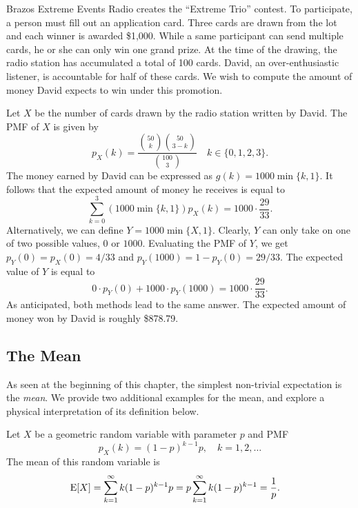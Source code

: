 \begin{example}
Brazos Extreme Events Radio creates the ``Extreme Trio'' contest.
To participate, a person must fill out an application card.
Three cards are drawn from the lot and each winner is awarded \$1,000.
While a same participant can send multiple cards, he or she can only win one grand prize.
At the time of the drawing, the radio station has accumulated a total of 100 cards.
David, an over-enthusiastic listener, is accountable for half of these cards.
We wish to compute the amount of money David expects to win under this promotion.

Let $X$ be the number of cards drawn by the radio station written by David.
The PMF of $X$ is given by
\begin{equation*}
p_X(k) = \frac{\binom{50}{k} \binom{50}{3-k}}{\binom{100}{3}}
\quad k \in \{ 0, 1, 2, 3 \}.
\end{equation*}
The money earned by David can be expressed as $g(k) = 1000 \min \{ k,1 \}$.
It follows that the expected amount of money he receives is equal to
\begin{equation*}
\sum_{k=0}^3 \left( 1000 \min \{ k, 1 \} \right) p_X(k)
= 1000 \cdot \frac{29}{33} .
\end{equation*}
Alternatively, we can define $Y = 1000 \min \{ X, 1 \}$.
Clearly, $Y$ can only take on one of two possible values, $0$ or $1000$.
Evaluating the PMF of $Y$, we get $p_Y(0) = p_X(0) = 4/33$ and $p_Y(1000) = 1 - p_Y(0) = 29/33$.
The expected value of $Y$ is equal to
\begin{equation*}
0 \cdot p_Y(0) + 1000 \cdot p_Y(1000) = 1000 \cdot \frac{29}{33} .
\end{equation*}
As anticipated, both methods lead to the same answer.
The expected amount of money won by David is roughly \$878.79.
\end{example}


\subsection{The Mean}

As seen at the beginning of this chapter, the simplest non-trivial expectation is the \emph{mean}.  
We provide two additional examples for the mean, and explore a physical interpretation of its definition below.

\begin{example}
Let $X$ be a geometric random variable with parameter $p$ and PMF
\begin{equation*}
p_X (k) = (1-p)^{k-1} p, \quad k = 1, 2, \ldots
\end{equation*}
The mean of this random variable is
\begin{equation*}
\begin{split}
\mathrm{E} [X] &= \sum_{k=1}^{\infty} k (1-p)^{k-1} p
= p \sum_{k=1}^{\infty} k (1-p)^{k-1}
= \frac{1}{p} .
\end{split}
\end{equation*}
\end{example}

